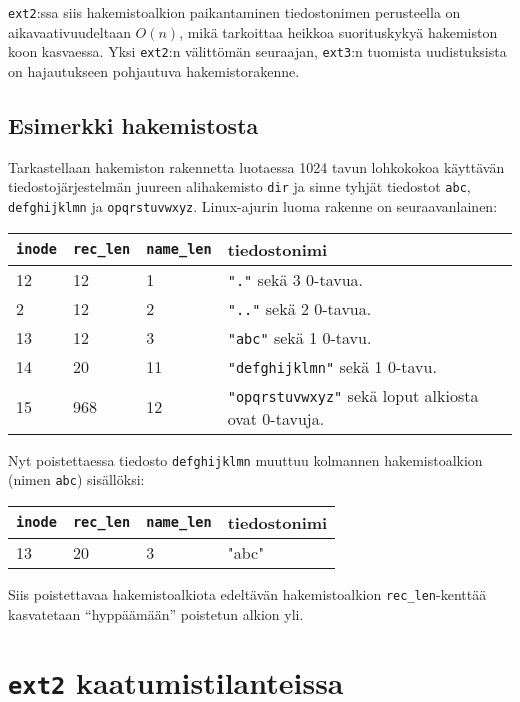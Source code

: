 \texttt{ext2}:ssa siis hakemistoalkion paikantaminen tiedostonimen perusteella on aikavaativuudeltaan $O(n)$,
mikä tarkoittaa heikkoa suorituskykyä hakemiston koon kasvaessa.
Yksi \texttt{ext2}:n välittömän seuraajan, \texttt{ext3}:n tuomista uudistuksista on hajautukseen pohjautuva hakemistorakenne.

\subsection{Esimerkki hakemistosta}
Tarkastellaan hakemiston rakennetta luotaessa 1024 tavun lohkokokoa käyttävän tiedostojärjestelmän juureen alihakemisto \texttt{dir} ja sinne tyhjät tiedostot \texttt{abc}, \texttt{defghijklmn} ja \texttt{opqrstuvwxyz}.
Linux-ajurin luoma rakenne on seuraavanlainen:

\begin{tabular}{llll}
    \texttt{inode} & \texttt{rec\_len} & \texttt{name\_len} & tiedostonimi \\ \hline
    12 & 12  & 1  & \texttt{"."}            sekä 3 0-tavua. \\
    2  & 12  & 2  & \texttt{".."}           sekä 2 0-tavua. \\
    13 & 12  & 3  & \texttt{"abc"}          sekä 1 0-tavu. \\
    14 & 20  & 11 & \texttt{"defghijklmn"}  sekä 1 0-tavu. \\
    15 & 968 & 12 & \texttt{"opqrstuvwxyz"} sekä loput alkiosta ovat 0-tavuja. \\
\end{tabular}

Nyt poistettaessa tiedosto \texttt{defghijklmn} muuttuu kolmannen hakemistoalkion (nimen \texttt{abc}) sisällöksi:

\begin{tabular}{llll}
    \texttt{inode} & \texttt{rec\_len} & \texttt{name\_len} & tiedostonimi \\ \hline
    13 & 20  & 3  & "abc"\\
\end{tabular}

Siis poistettavaa hakemistoalkiota edeltävän hakemistoalkion \texttt{rec\_len}-kenttää kasvatetaan ``hyppäämään'' poistetun alkion yli.

\section{\texttt{ext2} kaatumistilanteissa}
\label{ChapExt2Crash}

